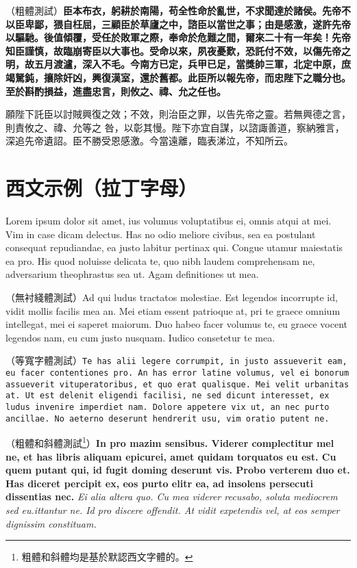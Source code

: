 \documentclass[
a4paper,
oneside,
12pt,
]{book}
\begin{document}
（粗體測試）\textbf{臣本布衣，躬耕於南陽，苟全性命於亂世，不求聞達於諸侯。先帝不以臣卑鄙，猥自枉屈，三顧臣於草廬之中，諮臣以當世之事；由是感激，遂許先帝以驅馳。後值傾覆，受任於敗軍之際，奉命於危難之間，爾來二十有一年矣！先帝知臣謹慎，故臨崩寄臣以大事也。受命以來，夙夜憂歎，恐託付不效，以傷先帝之明，故五月渡瀘，深入不毛。今南方已定，兵甲已足，當獎帥三軍，北定中原，庶竭駑鈍，攘除奸凶，興復漢室，還於舊都。此臣所以報先帝，而忠陛下之職分也。至於斟酌損益，進盡忠言，則攸之、禕、允之任也。}

願陛下託臣以討賊興復之效；不效，則治臣之罪，以告先帝之靈。若無興德之言，則責攸之、禕、允等之 咎，以彰其慢。陛下亦宜自謀，以諮諏善道，察納雅言，深追先帝遺詔。臣不勝受恩感激。今當遠離，臨表涕泣，不知所云。

\section{西文示例（拉丁字母）}

Lorem ipsum dolor sit amet, ius volumus voluptatibus ei, omnis atqui at mei. Vim in case dicam delectus. Has no odio meliore civibus, sea ea postulant consequat repudiandae, ea justo labitur pertinax qui. Congue utamur maiestatis ea pro. His quod noluisse delicata te, quo nibh laudem comprehensam ne, adversarium theophrastus sea ut. Agam definitiones ut mea.

（無衬綫體測試）\textsf{Ad qui ludus tractatos molestiae. Est legendos incorrupte id, vidit mollis facilis mea an. Mei etiam essent patrioque at, pri te graece omnium intellegat, mei ei saperet maiorum. Duo habeo facer volumus te, eu graece vocent legendos nam, eu cum justo nusquam. Iudico consetetur te mea.}

（等寬字體測試）\texttt{Te has alii legere corrumpit, in justo assueverit eam, eu facer contentiones pro. An has error latine volumus, vel ei bonorum assueverit vituperatoribus, et quo erat qualisque. Mei velit urbanitas at. Ut est delenit eligendi facilisi, ne sed dicunt interesset, ex ludus invenire imperdiet nam. Dolore appetere vix ut, an nec purto ancillae. No aeterno deserunt hendrerit usu, vim oratio putent ne.}

（粗體和斜體測試\footnote{粗體和斜體均是基於默認西文字體的。}）\textbf{In pro mazim sensibus. Viderer complectitur mel ne, et has libris aliquam epicurei, amet quidam torquatos eu est. Cu quem putant qui, id fugit doming deserunt vis. Probo verterem duo et. Has diceret percipit ex, eos purto elitr ea, ad insolens persecuti dissentias nec.} \textit{Ei alia altera quo. Cu mea viderer recusabo, soluta mediocrem sed eu.ittantur ne. Id pro discere offendit. At vidit expetendis vel, at eos semper dignissim constituam.}
\end{document}

